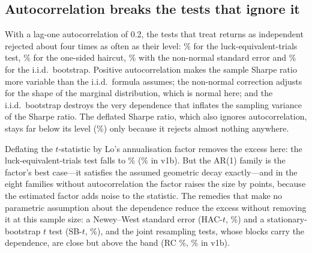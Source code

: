 \subsection{Autocorrelation breaks the tests that ignore it}
With a lag-one autocorrelation of 0.2, the tests that treat returns as independent rejected about four times as often as their level: \% for the luck-equivalent-trials test, \% for the one-sided haircut, \% with the non-normal standard error and \% for the i.i.d.\ bootstrap. Positive autocorrelation makes the sample Sharpe ratio more variable than the i.i.d.\ formula assumes; the non-normal correction adjusts for the shape of the marginal distribution, which is normal here; and the i.i.d.\ bootstrap destroys the very dependence that inflates the sampling variance of the Sharpe ratio. The deflated Sharpe ratio, which also ignores autocorrelation, stays far below its level (\%) only because it rejects almost nothing anywhere.

Deflating the $t$-statistic by Lo's annualisation factor removes the excess here: the luck-equivalent-trials test falls to \% (\% in v1b). But the AR(1) family is the factor's best case---it satisfies the assumed geometric decay exactly---and in the eight families without autocorrelation the factor raises the size by  points, because the estimated factor adds noise to the statistic. The remedies that make no parametric assumption about the dependence reduce the excess without removing it at this sample size: a Newey--West standard error (HAC-$t$, \%) and a stationary-bootstrap $t$ test (SB-$t$, \%), and the joint resampling tests, whose blocks carry the dependence, are close but above the band (RC \%, \% in v1b).

